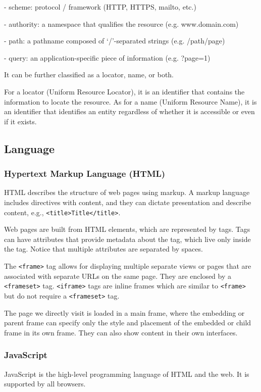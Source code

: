 - scheme: protocol / framework (HTTP, HTTPS, mailto, etc.)

- authority: a namespace that qualifies the resource (e.g. www.domain.com)

- path: a pathname composed of `/'-separated strings (e.g. /path/page)

- query: an application-specific piece of information (e.g. ?page=1)

It can be further classified as a locator, name, or both. 

For a locator (Uniform Resource Locator), it is an identifier that contains the information to locate the resource. As for a name (Uniform Resource Name), it is an identifier that identifies an entity regardless of whether it is accessible or even if it exists. 

\subsection{Language}

\subsubsection{Hypertext Markup Language (HTML)}
HTML describes the structure of web pages using markup. A markup language includes directives with content, and they can dictate presentation and describe content, e.g., \texttt{<title>Title</title>}. 

Web pages are built from HTML elements, which are represented by tags. Tags can have attributes that provide metadata about the tag, which live only inside the tag. Notice that multiple attributes are separated by spaces.

The \texttt{<frame>} tag allows for displaying multiple separate views or pages that are associated with separate URLs on the same page. They are enclosed by a \texttt{<frameset>} tag. \texttt{<iframe>} tags are inline frames which are similar to \texttt{<frame>} but do not require a \texttt{<frameset>} tag. 

The page we directly visit is loaded in a main frame, where the embedding or parent frame can specify only the style and placement of the embedded or child frame in its own frame. They can also show content in their own interfaces. 

\subsubsection{JavaScript}
JavaScript is the high-level programming language of HTML and the web. It is supported by all browsers.

